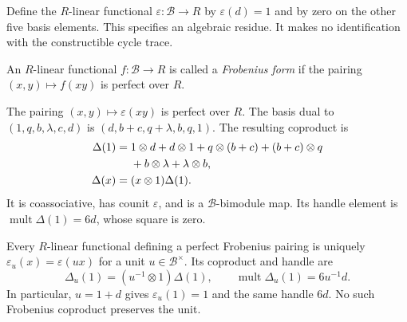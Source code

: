 Define the \(R\)-linear functional \(\varepsilon:\mathcal B\to R\)
by \(\varepsilon(d)=1\) and by zero on the other five basis
elements. This specifies an algebraic residue. It makes no
identification with the constructible cycle trace.

\begin{definition}
An \(R\)-linear functional \(f:\mathcal B\to R\) is called
a \emph{Frobenius form} if the pairing
\((x,y)\mapsto f(xy)\) is perfect over \(R\).
\end{definition}

\begin{theorem}\label{cyt:thm:frobenius}
The pairing \((x,y)\mapsto\varepsilon(xy)\) is perfect over
\(R\). The basis dual to \((1,q,b,\lambda,c,d)\) is
\((d,b+c,q+\lambda,b,q,1)\). The resulting coproduct is
\begin{align}
 \Delta(1)={}&1\otimes d+d\otimes1
       +q\otimes(b+c)+(b+c)\otimes q\notag\\
       &+b\otimes\lambda+\lambda\otimes b,
       \label{cyt:eq:casimir}\\
 \Delta(x)={}&(x\otimes1)\Delta(1).
       \label{cyt:eq:coproduct}
\end{align}
It is coassociative, has counit \(\varepsilon\), and is a
\(\mathcal B\)-bimodule map. Its handle element is
\(\operatorname{mult}\Delta(1)=6d\), whose square is zero.

Every \(R\)-linear functional defining a perfect Frobenius
pairing is uniquely
\(\varepsilon_u(x)=\varepsilon(ux)\) for a unit
\(u\in\mathcal B^\times\). Its coproduct and handle are
\[
 \Delta_u(1)=(u^{-1}\otimes1)\Delta(1),\qquad
 \operatorname{mult}\Delta_u(1)=6u^{-1}d.
\]
In particular, \(u=1+d\) gives
\(\varepsilon_u(1)=1\) and the same handle \(6d\).
No such Frobenius coproduct preserves the unit.
\end{theorem}

